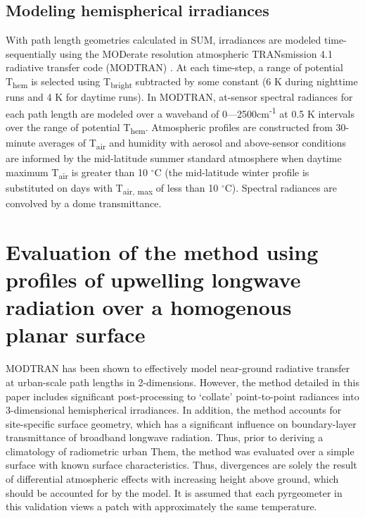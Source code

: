 \subsection{Modeling hemispherical irradiances}
With path length geometries calculated in SUM, irradiances are modeled time-sequentially using the MODerate resolution atmospheric TRANsmission 4.1 radiative transfer code (MODTRAN) \cite{Berk1987}. At each time-step, a range of potential T\textsubscript{hem} is selected using T\textsubscript{bright} subtracted by some constant (6 K during nighttime runs and 4 K for daytime runs). In MODTRAN, at-sensor spectral radiances for each path length are modeled over a waveband of 0---2500cm\textsuperscript{-1} at 0.5 K intervals over the range of potential T\textsubscript{hem}. Atmospheric profiles are constructed from 30-minute averages of T\textsubscript{air} and humidity with aerosol and above-sensor conditions are informed by the mid-latitude summer standard atmosphere when daytime maximum T\textsubscript{air} is greater than 10 $^{\circ}$C (the mid-latitude winter profile is substituted on days with T\textsubscript{air, max} of less than 10 $^{\circ}$C). 
Spectral radiances are convolved by a dome transmittance.




\section{Evaluation of the method using profiles of upwelling longwave radiation over a homogenous planar surface}

MODTRAN has been shown to effectively model near-ground radiative transfer at urban-scale path lengths in 2-dimensions. However, the method detailed in this paper includes significant post-processing to ‘collate’ point-to-point radiances into 3-dimensional hemispherical irradiances. In addition, the method accounts for site-specific surface geometry, which has a significant influence on boundary-layer transmittance of broadband longwave radiation. Thus, prior to deriving a climatology of radiometric urban Them, the method was evaluated over a simple surface with known surface characteristics. Thus, divergences are solely the result of differential atmospheric effects with increasing height above ground, which should be accounted for by the model. It is assumed that each pyrgeometer in this validation views a patch with approximately the same temperature. 

